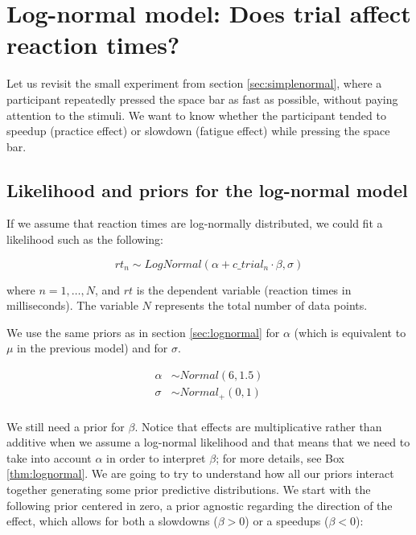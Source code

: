 \documentclass[12pt,]{krantz}
\theoremstyle{definition}
\theoremstyle{definition}
\theoremstyle{definition}
\theoremstyle{remark}
\begin{document}
\hypertarget{sec:trial}{%
\section{Log-normal model: Does trial affect reaction times?}\label{sec:trial}}

Let us revisit the small experiment from section \ref{sec:simplenormal}, where a participant repeatedly pressed the space bar as fast as possible, without paying attention to the stimuli. We want to know whether the participant tended to speedup (practice effect) or slowdown (fatigue effect) while pressing the space bar.

\hypertarget{likelihood-and-priors-for-the-log-normal-model}{%
\subsection{Likelihood and priors for the log-normal model}\label{likelihood-and-priors-for-the-log-normal-model}}

If we assume that reaction times are log-normally distributed, we could fit a likelihood such as the following:

\begin{equation}
rt_n \sim LogNormal(\alpha + c\_trial_n \cdot \beta,\sigma)
\label{eq:rtloglik}
\end{equation}

where \(n =1, \ldots, N\), and \(rt\) is the dependent variable (reaction times in milliseconds). The variable \(N\) represents the total number of data points.

We use the same priors as in section \ref{sec:lognormal} for \(\alpha\) (which is equivalent to \(\mu\) in the previous model) and for \(\sigma\).

\begin{equation}
\begin{aligned}
\alpha &\sim Normal(6, 1.5) \\
\sigma &\sim Normal_+(0, 1)\\
\end{aligned}
\end{equation}

We still need a prior for \(\beta\). Notice that effects are multiplicative rather than additive when we assume a log-normal likelihood and that means that we need to take into account \(\alpha\) in order to interpret \(\beta\); for more details, see Box \ref{thm:lognormal}. We are going to try to understand how all our priors interact together generating some prior predictive distributions. We start with the following prior centered in zero, a prior agnostic regarding the direction of the effect, which allows for both a slowdowns (\(\beta>0\)) or a speedups (\(\beta<0\)):
\end{document}
